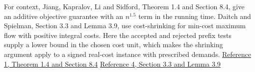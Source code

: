\documentclass[11pt]{article}
\begin{document}
For context, Jiang, Kapralov, Li and Sidford, Theorem 1.4 and Section 8.4, give an additive objective guarantee with an \(n^{1.5}\) term in the running time. Daitch and Spielman, Section 3.3 and Lemma 3.9, use cost-shrinking for min-cost maximum flow with positive integral costs. Here the accepted and rejected prefix tests supply a lower bound in the chosen cost unit, which makes the shrinking argument apply to a signed real-cost instance with prescribed demands. \href{https://arxiv.org/pdf/2510.17740}{Reference 1, Theorem 1.4 and Section 8.4} \href{https://arxiv.org/pdf/0803.0988}{Reference 4, Section 3.3 and Lemma 3.9}
\end{document}
